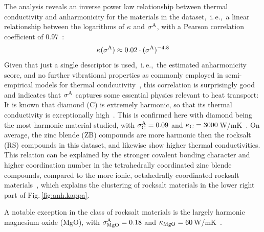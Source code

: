 The analysis reveals an inverse power law relationship between thermal conductivity and anharmonicity for the materials in the dataset,~i.\,e.,~a linear relationship between the logarithms of $\kappa$ and $\sigma^\mathrm{A}$, with a Pearson correlation coefficient of 0.97~\cite{Parzen.1960}:
%
\begin{align}
  \kappa (\sigma^\mathrm{A})
    \approx 0.02 \cdot (\sigma^\mathrm{A})^{-4.8}
\end{align}
%
 Given that just a single descriptor is used,~i.\,e.,~the estimated anharmonicity score, and no further vibrational properties as commonly employed in semi-empirical models for thermal condcutivity~\cite{Toberer.2011,Chen.2019}, this correlation is surprisingly good and indicates that $\sigma^\mathrm{A}$ captures some essential physics relevant to heat transport: It is known that diamond (C) is extremely harmonic, so that its thermal conductivity is exceptionally high~\cite{Haas.1938,Klemens.1958}. This is confirmed here with diamond being the most harmonic material studied, with $\sigma^\mathrm{A}_{\rm C} = 0.09$ and $\kappa_{\rm C} = 3000$\,W/mK~\cite{Morelli.2006}. On average, the zinc blende (ZB) compounds are more harmonic then the rocksalt (RS) compounds in this dataset, and likewise show higher thermal conductivities. This relation can be explained by the stronger covalent bonding character and higher coordination number in the tetrahedrally coordinated zinc blende compounds, compared to the more ionic, octahedrally coordinated rocksalt materials~\cite{Miller.2017}, which explains the clustering of rocksalt materials in the lower right part of Fig.\,\ref{fig:anh.kappa}.
 
 A notable exception in the class of rocksalt materials is the largely harmonic magnesium oxide (MgO), with $\sigma^\mathrm{A}_{\rm MgO} = 0.18$ and $\kappa_{\rm MgO} = 60$\,W/mK~\cite{Morelli.2006}.



